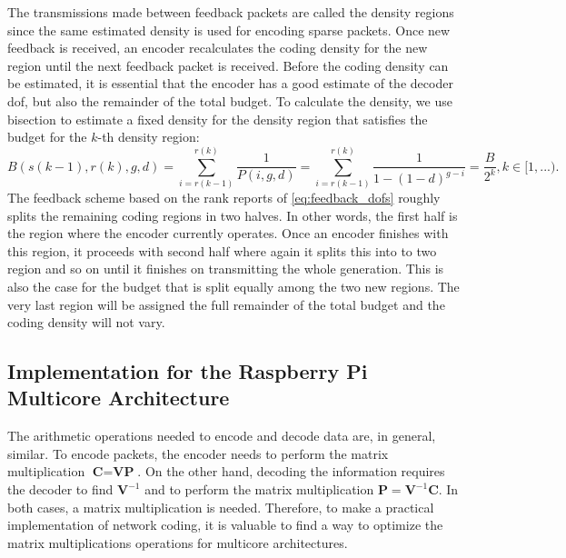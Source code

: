 The transmissions made between feedback packets are called the density regions
since the same estimated density is used for encoding sparse packets. Once new
feedback is received, an encoder recalculates the coding density for the new
region until the next feedback packet is received. Before the coding density can
be estimated, it is essential that the encoder has a good estimate of the
decoder \ac{dof}, but also the remainder of the total budget. To calculate the
density, we use bisection to estimate a fixed density for the density region
that satisfies the budget for the $k$-th density region:
\begin{equation}
B(s(k-1),r(k),g,d) = \sum^{r(k)}_{i=r(k-1)} \frac{1}{P(i,g,d)} = \sum^{r(k)}_{i=r(k-1)} \frac{1}{1-(1-d)^{g-i}} = \frac{B}{2^k}, k\in [1,...).
\end{equation}
%
The feedback scheme based on the rank reports of \eqref{eq:feedback_dofs}
roughly splits the remaining coding regions in two halves. In other
words, the first half is the region where the encoder currently operates. Once
an encoder finishes with this region, it proceeds with second half where again
it splits this into to two region and so on until it finishes on transmitting
the whole generation. This is also the case for the budget that is split equally
among the two new regions. The very last region will be assigned the full
remainder of the total budget and the coding density will not vary.

\subsection{Implementation for the Raspberry Pi Multicore Architecture}
\label{sub:implementation-multicore}

The arithmetic operations needed to encode and decode data are,
in general, similar. To encode packets, the encoder needs to perform the
matrix multiplication $\textbf{C} = \textbf{V} \textbf{P}$. On the other
hand, decoding the information requires the decoder to find
$\textbf{V}^{-1}$ and to perform the matrix multiplication
$\textbf{P} = \textbf{V}^{-1} \textbf{C}$. In both cases, a matrix
multiplication is needed. Therefore, to make a practical implementation of
network coding, it is valuable to find a way to optimize the matrix
multiplications operations for multicore architectures.

